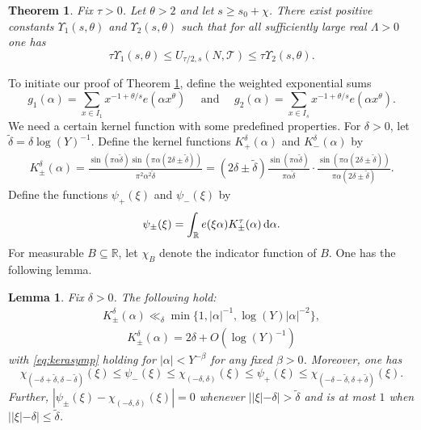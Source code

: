 \documentclass[11pt,reqno]{amsart}
\numberwithin{equation}{section}
\newtheorem{lemma}{Lemma}[section]
\renewcommand{\d}{\,{\rm d}}
\newtheorem{theorem}{Theorem}[section]
\begin{document}
\begin{theorem} \label{thm:DH} 
Fix $\tau > 0$. Let $\theta > 2$ and let $s \geq s_0+\chi$. There exist positive constants $ \Upsilon_1(s,\theta) $ and $\Upsilon_2(s,\theta)$ such that for all sufficiently large real $\Lambda > 0$ one has 
\[ \tau\Upsilon_1(s,\theta) \leq U_{\tau/2,s}(N,\mathcal{T})\leq \tau\Upsilon_2(s,\theta). \]
\end{theorem}
To initiate our proof of Theorem \ref{thm:DH}, define the weighted exponential sums 
\[ g_1(\alpha) = \sum_{x \in I_1} x^{-1+\theta/s}e(\alpha x^{\theta}) \quad \text{ and } \quad g_2(\alpha) = \sum_{x \in I_s} x^{-1+\theta/s}e(\alpha x^{\theta}). \]
We need a certain kernel function with some predefined properties. For $\delta > 0$, let $\tilde{\delta} = \delta\log(Y)^{-1}$. Define the kernel functions $K^{\delta}_+(\alpha)$ and $K^{\delta}_-(\alpha)$ by 
\begin{align} \label{eq:kerform}
K^{\delta}_{\pm}(\alpha) = \frac{\sin(\pi\alpha\tilde{\delta})\sin(\pi\alpha(2\delta\pm\tilde{\delta}))}{\pi^2 \alpha^2 \tilde{\delta}} = (2\delta\pm\tilde{\delta})\frac{\sin(\pi \alpha \tilde{\delta})}{\pi\alpha\tilde{\delta}} \cdot \frac{\sin(\pi\alpha(2\delta\pm \tilde{\delta}))}{\pi \alpha (2\delta\pm\tilde{\delta})}.
\end{align} 
Define the functions $\psi_+(\xi)$ and $\psi_-(\xi)$ by 
\[ \psi_{\pm}(\xi) = \int_{\mathbb{R}} e(\xi\alpha)K^{\tau}_{\pm}(\alpha)\d\alpha. \]
For measurable $B \subseteq \mathbb{R}$, let $\chi_{B}$ denote the indicator function of $B$. One has the following lemma. 
\begin{lemma} \label{lem:kernel}
Fix $\delta > 0$. The following hold: 
\begin{align} \label{eq:kerbound}
K^{\delta}_{\pm}(\alpha) \ll_{\delta} \min\{1, |\alpha|^{-1},\log(Y)|\alpha|^{-2} \},
\end{align}
\begin{align} \label{eq:kerasymp}
K^{\delta}_{\pm}(\alpha) = 2\delta+O(\log(Y)^{-1}) 
\end{align}
with \eqref{eq:kerasymp} holding for $|\alpha| < Y^{-\beta}$ for any fixed $\beta > 0$. Moreover, one has
\[ \chi_{(-\delta+\tilde{\delta},\delta-\tilde{\delta})} (\xi) \leq \psi_-(\xi) \leq \chi_{(-\delta,\delta)}(\xi) \leq \psi_+(\xi) \leq \chi_{(-\delta-\tilde{\delta},\delta+\tilde{\delta})}(\xi). \]
Further, $|\psi_{\pm}(\xi)-\chi_{(-\delta,\delta)}(\xi)| = 0$ whenever $||\xi|-\delta|>\tilde{\delta}$ and is at most $1$ when $||\xi|-\delta|\leq \tilde{\delta}$. 
\end{lemma}
\end{document}
